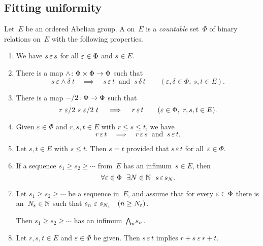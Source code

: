 \documentclass[main.tex]{subfiles}
\begin{document}
\subsection{Fitting uniformity}
\label{SS:fitting}
%
%
\begin{dfn}
\label{D:uniformity}
Let~$E$ be an ordered Abelian group.
A  on~$E$
is a \emph{countable} set~$\Phi$ of binary relations on~$E$
with the following properties.
\begin{enumerate}
\item 
\label{E-refl}
We have $s \,\varepsilon\, s$ for all $\varepsilon \in \Phi$ and $s \in E$.
\item
\label{E-min}
There is a map $\wedge\colon \Phi\times\Phi \rightarrow \Phi$
such that
\begin{equation*}
s \ \varepsilon\wedge\delta\  t
\quad\implies\quad
s \,\varepsilon\,t\ \text{ and }\ s\,\delta\,t
\qquad (\varepsilon,\delta\in\Phi,\ s,t\in E).
\end{equation*}

\item
\label{E-half}
There is a map $-/2\colon \Phi \rightarrow \Phi$
such that
\begin{equation*}
r\ \varepsilon/2 \ s \ \varepsilon/2 \ t
\quad\implies\quad
r \,\varepsilon\, t\qquad(\varepsilon\in\Phi,\ r,s,t\in E).
\end{equation*}

\item \label{E-ord}
Given $\varepsilon\in\Phi$ and $r,s,t\in E$ 
with $r\leq s\leq t$,
we have
\begin{equation*}
r\,\varepsilon\,t
\quad\implies\quad
r\,\varepsilon\,s
\ \text{ and }\ 
s\,\varepsilon\,t.
\end{equation*}

\item \label{E-haus}
Let $s,t\in E$ with $s\leq t$.
Then $s=t$ provided that $s\,\varepsilon\,t$ for all~$\varepsilon\in\Phi$.

\item \label{E-inf-conv}
If a sequence $s_1 \geq s_2 \geq \dotsb$ from~$E$
has an infimum~$s\in E$,
then 
\begin{equation*}
\forall\varepsilon\in \Phi
\ \ \exists N\in \mathbb{N}
\ \ s \, \varepsilon\, s_N.
\end{equation*}

\item  \label{E-bound-inf}
Let $s_1\geq s_2 \geq \dotsb$ be a
sequence in~$E$,
and assume that
for every $\varepsilon\in \Phi$
there is an~$N_\varepsilon \in \mathbb{N}$ such that 
$s_{n} \ \varepsilon \ s_{N_\varepsilon}\quad (n\geq N_\varepsilon)$.

Then $s_1 \geq s_2 \geq \dotsb$ has an infimum~$\textstyle{\bigwedge}_n s_n$.

\item \label{E-add}
Let $r,s,t\in E$ and $\varepsilon\in\Phi$ be given.
Then $s\,\varepsilon\,t$ implies $r+s\ \varepsilon\ r+t$.
\setcounter{epropc}{\value{enumi}}
\end{enumerate}
\end{dfn}
\end{document}
